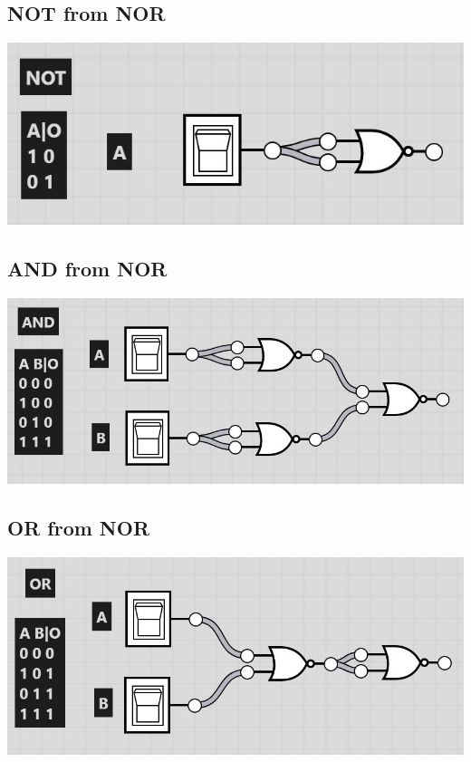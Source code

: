 \documentclass[11pt]{book}
\begin{document}
\subsection{NOT from NOR}

\includegraphics[width=\textwidth]{figures/NOT.jpg}

\subsection{AND from NOR}

\includegraphics[width=\textwidth]{figures/AND.jpg}

\subsection{OR from NOR}

\includegraphics[width=\textwidth]{figures/OR.jpg}
\end{document}
